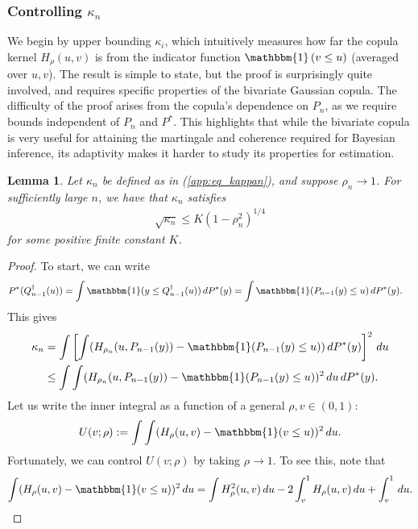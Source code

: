 \documentclass[11pt,a4paper]{article}
\newtheorem{lem}{Lemma}
\begin{document}
\begin{appendices}
\subsubsection{Controlling $\kappa_n$}
We begin by upper bounding $\kappa_i$, which intuitively measures how far the copula kernel $H_\rho(u,v)$ is from the indicator function $\mathbbm{1}\left(v \leq u\right)$ (averaged over $u,v$). The result is simple to state, but the proof is surprisingly quite involved, and requires specific properties of the bivariate Gaussian copula. The difficulty of the proof arises from the copula's dependence on $P_n$, as we require bounds independent of $P_n$ and $P^*$. This
highlights that while the bivariate copula is very useful for attaining the martingale and coherence required for Bayesian inference, its adaptivity makes it harder to study its properties for estimation. 
\begin{lem}\label{app:lem_kappan}
    Let $\kappa_n$ be defined as in (\ref{app:eq_kappan}), and suppose $\rho_n \to 1$. For sufficiently large $n$, we have that $\kappa_n$ satisfies
    \begin{align*}
\sqrt{\kappa_n} \leq K (1-\rho_n^2)^{1/4}
    \end{align*}
    for some positive finite constant $K$.
\end{lem}
\begin{proof}
    To start, we can write
\begin{align*}
    P^*(Q_{n-1}^{\dagger}(u)) & = \int \mathbbm{1}(y \leq Q_{n-1}^{\dagger}(u)  )\, dP^*(y) = \int \mathbbm{1}(P_{n-1}(y)\leq u )\, dP^*(y).
\end{align*}
This gives
\begin{align*}
    \kappa_n &= \int \left[\int(H_{\rho_n}(u,P_{n-1}(y)) - \mathbbm{1}(P_{n-1}(y) \leq u)) \,dP^*(y)\right]^2\,  du\\
    &\leq \int\int(H_{\rho_n}(u,P_{n-1}(y)) - \mathbbm{1}(P_{n-1}(y) \leq u))^2 \, du \,  dP^*(y).
\end{align*}
Let us write the inner integral as a function of a  general $\rho,v \in (0,1)$:
\begin{align*}
    U(v;\rho) := \int\int(H_{\rho}(u,v) - \mathbbm{1}(v \leq u))^2 \, du.
\end{align*}
Fortunately, we can control  $U(v;\rho)$ by taking $\rho \to 1$. To see this,  note that
\begin{align}\label{app:eq_intHuv}
    \int(H_{\rho}(u,v) - \mathbbm{1}(v \leq u))^2 \, du = \int H^2_{\rho}(u,v) \, du  - 2\int_{v}^1 H_\rho(u,v) \, du + \int_v^1 \,du.

\end{align}
\end{proof}
\end{appendices}
\end{document}
